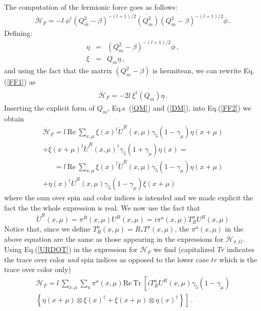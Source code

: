 \documentclass{article}[12pt]
\begin{document}
The computation of the fermionic force goes as follows:
\begin{eqnarray}
\dot{\mathcal{H}}_F = -l\ \phi^\dagger (Q_m^2 - \beta)^{-(l+1)/2} \dot{(Q_m^2)} (Q_m^2 - \beta)^{-(l+1)/2} \phi \, . \label{FF1}
\end{eqnarray}
Defining:
\begin{eqnarray}
\eta &=& (Q_m^2 - \beta)^{-(l+1)/2} \phi \, , \\
\xi &=& Q_m \eta \, ,
\end{eqnarray}
and using the fact that the matrix $(Q_m^2-\beta)$ is hermitean, we can rewrite Eq.(\ref{FF1}) as
\begin{eqnarray}
\dot{\mathcal{H}}_F = - 2 l\ \xi^\dagger \dot{(Q_m)} \eta \, . \label{FF2}
\end{eqnarray}
Inserting the explicit form of $Q_m$, Eq.s~(\ref{QM}) and (\ref{DM}), into Eq.(\ref{FF2}) we obtain
\begin{multline}
\dot{\mathcal{H}}_F = l\ \mathrm{Re\ }\sum_{x,\mu} \xi(x)^\dagger \dot U^R(x,\mu) \gamma_5 (1-\gamma_\mu) \eta(x+\mu) \\ 
+ \xi(x+\mu)^\dagger \dot U^R(x,\mu)^\dagger \gamma_5 (1+\gamma_\mu) \eta(x) = \nonumber 
\end{multline}
\begin{multline}
\phantom{\dot{\mathcal{H}}_F} =  l\ \mathrm{Re\ }\sum_{x,\mu} \xi(x)^\dagger \dot U^R(x,\mu) \gamma_5 (1-\gamma_\mu) \eta(x+\mu) \\ 
+ \eta(x)^\dagger \dot U^R(x,\mu) \gamma_5 (1-\gamma_\mu) \xi(x+\mu)
\end{multline}
where the sum over spin and color indices is intended and we made explicit the fact the the whole 
expression is real.
We now use the fact that 
\begin{equation}
\dot U^R (x,\mu) = \pi^R(x,\mu) U^R(x,\mu) = i \pi^a(x,\mu) T^a_R U^R(x,\mu) \label{URDOT}
\end{equation}
Notice that, since we define $T^a_R(x,\mu) = R_* T^a(x,\mu)$, the $\pi^a(x,\mu)$ in the above 
equation are the same as those appearing in the expressions for $\dot{\mathcal{H}}_{\pi,G}$.
Using Eq.(\ref{URDOT}) in the expression for $\dot{\mathcal{H}}_{F}$ we find
(capitalized $Tr$ indicates the trace over color \textit{and} spin indices as opposed to the lower
 case $tr$ which is the trace over color only)
\begin{multline}
\dot{\mathcal{H}}_F = l\ \sum_{x,\mu} \sum_a \pi^a(x,\mu) \mathrm{Re\ Tr\ } \left[ iT^a_R U^R(x,\mu) \gamma_5 (1-\gamma_\mu) \right. \\
		\left. \left\{ \eta(x+\mu)\otimes\xi(x)^\dagger + \xi(x+\mu)\otimes\eta(x)^\dagger \right\} \right] \, . \label{HDOTF}
\end{multline}
\end{document}

